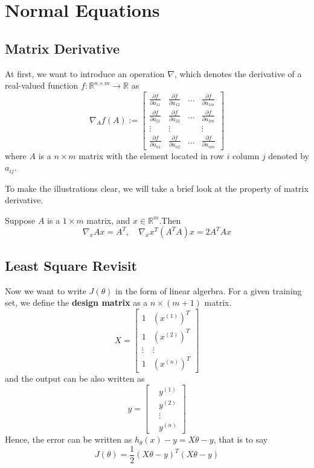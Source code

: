 \section{Normal Equations}

\subsection{Matrix Derivative}
At first, we want to introduce an operation $\nabla $, which denotes the derivative of a real-valued function $f: \mathbb{R}^{n\times m} \rightarrow \mathbb{R}$ as 
\[\nabla_A f(A) := \left[
\begin{array}{cccc}
    \frac{\partial f}{\partial a_{11}} & \frac{\partial f}{\partial a_{12}} & \ldots & \frac{\partial f}{\partial a_{1m}}\\
    \frac{\partial f}{\partial a_{21}} & \frac{\partial f}{\partial a_{22}} & \ldots & \frac{\partial f}{\partial a_{2m}}\\
    \vdots & \vdots & & \vdots\\
    \frac{\partial f}{\partial a_{n1}} & \frac{\partial f}{\partial a_{n2}} & \ldots & \frac{\partial f}{\partial a_{nm}}
\end{array}\right]
\]
where $A$ is a $n \times m$ matrix with the element located in row $i$ column $j$ denoted by $a_{ij}$.

To make the illustrations clear, we will take a brief look at the property of matrix derivative.
\begin{prop}
    Suppose $A$ is a $1 \times m$ matrix, and $x \in \mathbb{R}^m$.Then
    \[\nabla_x Ax = A^T,\quad\nabla_x x^T(A^TA)x = 2A^TAx\]
\end{prop}

\subsection{Least Square Revisit}

Now we want to write $J(\theta)$ in the form of linear algerbra. For a given training set, we define the \textbf{design matrix} as a $n\times (m+1)$ matrix. 
\[X = \left[
    \begin{array}{cc}
        1 & (x^{(1)})^T \\
        1 & (x^{(2)})^T \\
        \vdots & \vdots\\
        1 & (x^{(n)})^T
    \end{array}
\right]\]
and the output can be also written as 
\[ y = \left[
    \begin{aligned}
        & y^{(1)}\\
        & y^{(2)}\\
        & \vdots\\
        & y^{(n)}
    \end{aligned}
\right]\]
Hence, the error can be written as $h_\theta(x) - y = X\theta - y$, that is to say 
\[J(\theta) = \frac{1}{2}(X\theta - y)^T(X\theta - y)\]

